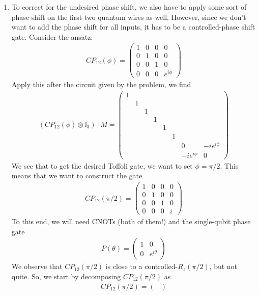 \documentclass{article}
\theoremstyle{definition}
\begin{document}
\begin{enumerate}[label=(\alph*)]
	\item To correct for the undesired phase shift, we also have to apply some sort of phase shift on the first two quantum wires as well. However, since we don't want to add the phase shift for all inputs, it has to be a controlled-phase shift gate. Consider the ansatz:
	\begin{align*}
		CP_{12}(\phi) = \begin{pmatrix}
			1 &0&0&0\\
			0&1&0&0\\
			0&0&1&0\\
			0&0&0&e^{i\phi}
		\end{pmatrix}
	\end{align*}
	Apply this after the circuit given by the problem, we find 
	\begin{align*}
		 ( CP_{12}(\phi) \otimes \mathbb{I}_3) \cdot M = \begin{pmatrix}
			1&&&&&&& \\
			&1&&&&&& \\
			&&1&&&&& \\
			&&&1&&&& \\
			&&&&1&&& \\
			&&&&&1&& \\
			&&&&&&0&-ie^{i\phi} \\
			&&&&&&-i e^{i\phi}&0 
		\end{pmatrix}
	\end{align*}
	We see that to get the desired Toffoli gate, we want to set $\phi = \pi/2$. This means that we want to construct the gate
	\begin{align*}
		CP_{12}(\pi/2) = \begin{pmatrix}
			1 &0&0&0\\
			0&1&0&0\\
			0&0&1&0\\
			0&0&0&i
		\end{pmatrix}
\end{align*}
To this end, we will need CNOTs (both of them!) and the single-qubit phase gate 
\begin{align*}
	P(\theta) = \begin{pmatrix}
		1 & 0 \\ 0 & e^{i\theta}
	\end{pmatrix}
\end{align*}
We observe that $CP_{12}(\pi/2)$ is close to a controlled-$R_z(\pi/2)$, but not quite.  So, we start by decomposing $CP_{12}(\pi/2)$ as 
\begin{align*}
	CP_{12}(\pi/2) = \begin{pmatrix}

\end{pmatrix}
\end{align*}
\end{enumerate}
\end{document}
